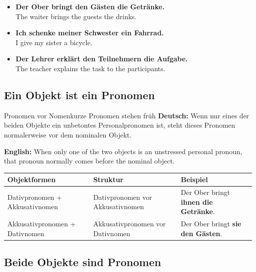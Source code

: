 \documentclass[a4paper,11pt]{article}
\newcommand{\GermanText}[1]{\textbf{Deutsch: }#1\par}
\newcommand{\EnglishText}[1]{{\small\color{SoftGray}\textbf{English: }#1\par}}
\newcommand{\ExampleItem}[2]{\item \textbf{#1}\\{\small\color{SoftGray}#2}}
\newcommand{\TableHeader}[1]{\color{white}\textbf{#1}}
\begin{document}
            \begin{exbox}
                \begin{itemize}
                    \ExampleItem{Der Ober bringt den Gästen die Getränke.}{The waiter brings the guests the drinks.}
                    \ExampleItem{Ich schenke meiner Schwester ein Fahrrad.}{I give my sister a bicycle.}
                    \ExampleItem{Der Lehrer erklärt den Teilnehmern die Aufgabe.}{The teacher explains the task to the participants.}
                \end{itemize}
            \end{exbox}
        
        \subsection{Ein Objekt ist ein Pronomen}
            
            \begin{grammarentry}{Pronomen vor Nomen}{kurze Pronomen stehen früh}
                \GermanText{Wenn nur eines der beiden Objekte ein unbetontes Personalpronomen ist, steht dieses Pronomen normalerweise vor dem nominalen Objekt.}
                \EnglishText{When only one of the two objects is an unstressed personal pronoun, that pronoun normally comes before the nominal object.}
            \end{grammarentry}
            
            \begin{longtable}{|p{4.0cm}|p{5.0cm}|p{5.0cm}|}
                \hline
                \rowcolor{HeaderBlueDark}
                \TableHeader{Objektformen} & \TableHeader{Struktur} & \TableHeader{Beispiel} \\
                \hline
                Dativpronomen + Akkusativnomen & Dativpronomen vor Akkusativnomen & Der Ober bringt \textbf{ihnen die Getränke}. \\
                \hline
                Akkusativpronomen + Dativnomen & Akkusativpronomen vor Dativnomen & Der Ober bringt \textbf{sie den Gästen}. \\
                \hline
            \end{longtable}
        
        \subsection{Beide Objekte sind Pronomen}
            
\end{document}
